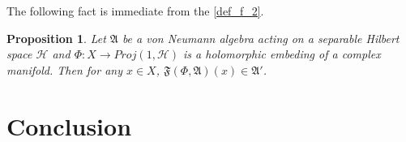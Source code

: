 \documentclass[a4paper,10pt]{amsart}
\newtheorem{proposition}{Proposition}[section]
\newcommand{\AAA}{\mathfrak A}
\newcommand{\F}{\mathfrak F}
\newcommand{\HHH}{\mathcal H} %
\begin{document}
The following fact is immediate from the \cref{def_f_2}.

\begin{proposition}
    Let $\AAA$ be a von Neumann algebra acting on a separable Hilbert
    space $\HHH$ and $\Phi: X \rightarrow Proj(1,\HHH)$ is a
    holomorphic embeding of a complex manifold. Then for any $x \in X$,
    $\F(\Phi, \AAA)(x) \in \AAA '$.
\end{proposition}



\section{Conclusion}



\end{document}
